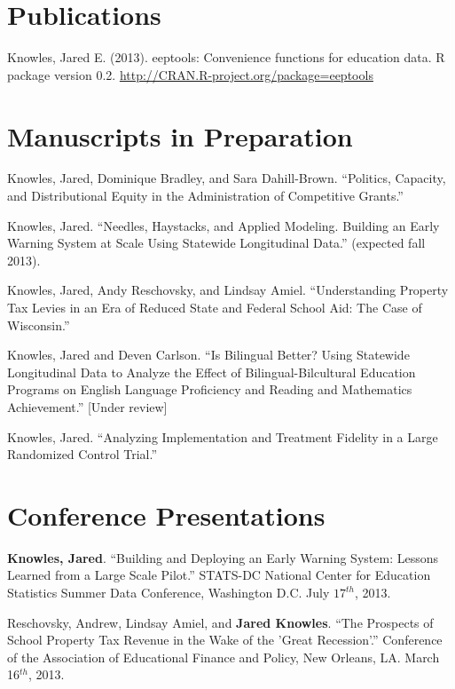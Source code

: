 \documentclass[margin,line]{res}
\begin{document}
\begin{resume}

\vspace{-.1cm}
\section{\sc Publications}

Knowles, Jared E. (2013). eeptools: Convenience functions for education data. R package
  version 0.2. \url{http://CRAN.R-project.org/package=eeptools}

\vspace{-.1cm}
\section{\sc Manuscripts in Preparation}

Knowles, Jared, Dominique Bradley, and Sara Dahill-Brown. ``Politics, Capacity, and Distributional Equity in the Administration of Competitive Grants.''

Knowles, Jared. ``Needles, Haystacks, and Applied Modeling. Building an Early Warning System at 
Scale Using Statewide Longitudinal Data.'' (expected fall 2013). 

Knowles, Jared, Andy Reschovsky, and Lindsay Amiel. ``Understanding Property Tax Levies in an Era of Reduced State and Federal School Aid: The Case of Wisconsin.'' 

Knowles, Jared and Deven Carlson. ``Is Bilingual Better? Using Statewide Longitudinal Data to Analyze the Effect of Bilingual-Bilcultural Education Programs on English Language Proficiency and Reading and Mathematics Achievement.'' [Under review]

Knowles, Jared. ``Analyzing Implementation and Treatment Fidelity in a Large Randomized Control Trial.''


\section{\sc Conference Presentations}

\textbf{Knowles, Jared}. ``Building and Deploying an Early Warning System: Lessons Learned from a Large Scale Pilot.'' STATS-DC National Center for Education Statistics Summer Data Conference, Washington D.C. July $17^{th}$, 2013.

Reschovsky, Andrew, Lindsay Amiel, and \textbf{Jared Knowles}. ``The Prospects of School Property Tax Revenue in the Wake of the 'Great Recession'.'' Conference of the Association of Educational Finance and Policy, New Orleans, LA. March 16$^{th}$, 2013. 


\end{resume}
\end{document}

